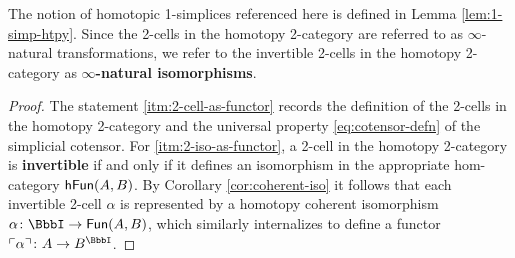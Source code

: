   The notion of homotopic 1-simplices referenced here is defined in Lemma \ref{lem:1-simp-htpy}. Since the 2-cells in the homotopy 2-category are referred to as $\infty$-natural transformations, we refer to the invertible 2-cells in the homotopy 2-category as \textbf{$\infty$-natural isomorphisms}.

  \begin{proof}
  The statement \ref{itm:2-cell-as-functor} records the definition of the 2-cells in the homotopy 2-category and the universal property \eqref{eq:cotensor-defn} of the simplicial cotensor.  For \ref{itm:2-iso-as-functor}, a 2-cell in the homotopy 2-category is \textbf{invertible} if and only if it defines an isomorphism in the appropriate hom-category ${\mathord{\mathsf{hFun}}}(A,B)$. By  Corollary \ref{cor:coherent-iso} it follows that each invertible 2-cell $\alpha$ is represented by a homotopy coherent isomorphism ${\alpha} \colon \iso \to \Fun(A,B)$, which similarly internalizes to define a functor $\name{\alpha} \colon A \to B^\iso$.
  \end{proof}


